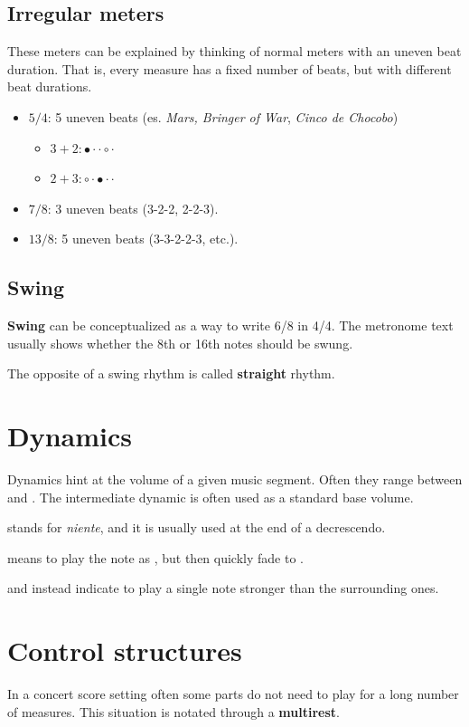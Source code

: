 \subsection{Irregular meters}
These meters can be explained by thinking of normal meters with an uneven beat duration. That is, every measure has a fixed number of beats, but with different beat durations.

\begin{itemize}
    \item $5/4$: 5 uneven beats (es. \emph{Mars, Bringer of War}, \emph{Cinco de Chocobo})
    \begin{itemize}
        \item $3+2: \bullet \cdot \cdot \circ \cdot$
        \item $2+3: \circ \cdot \bullet \cdot \cdot$
    \end{itemize}
    \item $7/8$: 3 uneven beats (3-2-2, 2-2-3).
    \item $13/8$: 5 uneven beats (3-3-2-2-3, etc.).
\end{itemize}

\subsection{Swing}
\textbf{Swing} can be conceptualized as a way to write 6/8 in 4/4. The metronome text usually shows whether the 8th or 16th notes should be swung.

The opposite of a swing rhythm is called \textbf{straight} rhythm.

\section{Dynamics}
Dynamics hint at the volume of a given music segment. Often they range between  and . The intermediate dynamic  is often used as a standard base volume.

 stands for \emph{niente}, and it is usually used at the end of a decrescendo.

 means to play the note as , but then quickly fade to .

 and  instead indicate to play a single note stronger than the surrounding ones.

\section{Control structures}
In a concert score setting often some parts do not need to play for a long number of measures. This situation is notated through a \textbf{multirest}.

